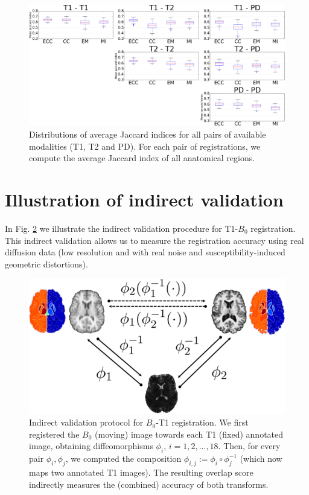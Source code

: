 \documentclass[journal]{IEEEtran}
\newcommand{\figcloser}{\vspace{-0.4cm}}
\begin{document}
\begin{figure}[t!]
\centering
    \includegraphics[width=0.75\linewidth]{./images/all_modality_pairs_boxplots.png}
    \caption{{\small Distributions of average Jaccard indices for all pairs of available modalities (T1, T2 and PD). For each pair of registrations, we compute the average Jaccard index of all anatomical regions.}}
\label{fig:all_pairs_boxplots}\figcloser
\end{figure}

\section{Illustration of indirect validation}
In Fig. \ref{fig:indirect_validation} we illustrate the indirect validation procedure for T1-$B_0$ registration. This indirect validation allows us to measure the registration accuracy using real diffusion data (low resolution and with real noise and susceptibility-induced geometric distortions).
\begin{figure}[t!]
\centering
    \includegraphics[width=0.75\linewidth]{./images/new_validation.png}
    \caption{{\small Indirect validation protocol for $B_{0}$-T1 registration. We first registered the $B_{0}$ (moving) image towards each T1 (fixed) annotated image, obtaining diffeomorphisms $\phi_{i}$, $i=1,2,...,18$. Then, for every pair $\phi_{i}, \phi_{j}$, we computed the composition $\phi_{i,j}:=\phi_{i}\circ \phi_{j}^{-1}$ (which now maps two annotated T1 images). The resulting overlap score indirectly measures the (combined) accuracy of both transforms.}}
\label{fig:indirect_validation}\figcloser
\end{figure}
%



\end{document}
